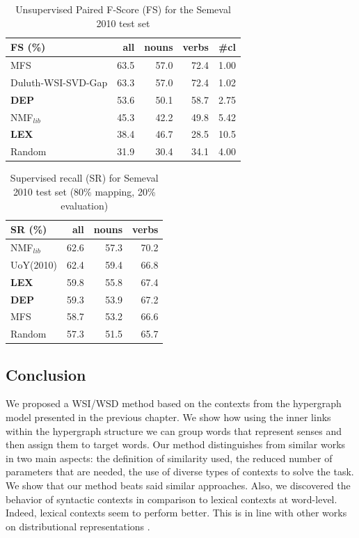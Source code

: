 \begin{table}[]
\centering

\begin{tabular}{@{}lrrrr@{}}
\toprule
\textbf{FS (\%)} & \textbf{all} & \textbf{nouns} & \textbf{verbs} & \textbf{\#cl} \\ \midrule
MFS & 63.5 & 57.0 & 72.4 & 1.00 \\
Duluth-WSI-SVD-Gap & 63.3 & 57.0 & 72.4 & 1.02 \\
\textbf{DEP} & 53.6 & 50.1 & 58.7 & 2.75 \\
NMF$_{lib}$&45.3&42.2&49.8&5.42\\
\textbf{LEX} & 38.4 & 46.7 & 28.5 & 10.5 \\
Random & 31.9 & 30.4 & 34.1 & 4.00 \\ \bottomrule
\end{tabular}
\caption{Unsupervised Paired F-Score (FS) for the Semeval 2010 test set}
\label{tab:sem2010_FS}
\end{table}


\begin{table}[h!]
\centering

\begin{tabular}{@{}lrrr@{}}
\toprule
\textbf{SR (\%)} & \textbf{all} & \textbf{nouns} & \textbf{verbs} \\ \midrule
NMF$_{lib}$&62.6&57.3&70.2\\
UoY(2010) & 62.4 & 59.4 & 66.8 \\

\textbf{LEX} & 59.8 & 55.8 & 67.4 \\
\textbf{DEP} & 59.3 & 53.9 & 67.2 \\
MFS & 58.7 & 53.2 & 66.6 \\
Random & 57.3 & 51.5 & 65.7 \\ \bottomrule

\end{tabular}

\caption{Supervised recall (SR) for Semeval 2010 test set (80\% mapping, 20\% evaluation)}
\label{tab:sem2010_SR}
\end{table}


\subsection{Conclusion}
We proposed a WSI/WSD method based on the contexts from the hypergraph model presented in the previous chapter. We show how using the inner links within the hypergraph structure we can group words that represent senses and then assign them to target words. Our method distinguishes from similar works in two main aspects: the definition of similarity used, the reduced number of parameters that are needed, the use of diverse types of contexts to solve the task. 	We show that our method beats said similar approaches. Also, we discovered the behavior of syntactic contexts in comparison to lexical contexts at word-level. Indeed, lexical contexts seem to perform better. This is in line with other works on distributional representations \cite{kiela2014systematic}.





